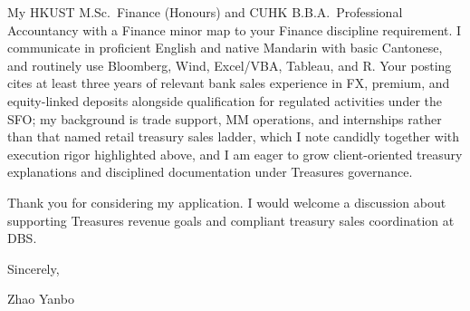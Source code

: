 \documentclass[10pt,a4paper]{article}
\begin{document}
My HKUST M.Sc.\ Finance (Honours) and CUHK B.B.A.\ Professional Accountancy with a Finance minor map to your Finance discipline requirement. I communicate in proficient English and native Mandarin with basic Cantonese, and routinely use Bloomberg, Wind, Excel/VBA, Tableau, and R. Your posting cites at least three years of relevant bank sales experience in FX, premium, and equity-linked deposits alongside qualification for regulated activities under the SFO; my background is trade support, MM operations, and internships rather than that named retail treasury sales ladder, which I note candidly together with execution rigor highlighted above, and I am eager to grow client-oriented treasury explanations and disciplined documentation under Treasures governance.

Thank you for considering my application. I would welcome a discussion about supporting Treasures revenue goals and compliant treasury sales coordination at DBS.

\vspace{1em}

Sincerely,

\vspace{2em}

Zhao Yanbo
\end{document}
